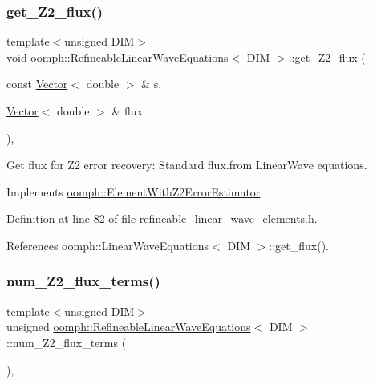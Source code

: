 \subsubsection{\texorpdfstring{get\+\_\+\+Z2\+\_\+flux()}{get\_Z2\_flux()}}
{\footnotesize\ttfamily template$<$unsigned D\+IM$>$ \\
void \hyperlink{classoomph_1_1RefineableLinearWaveEquations}{oomph\+::\+Refineable\+Linear\+Wave\+Equations}$<$ D\+IM $>$\+::get\+\_\+\+Z2\+\_\+flux (\begin{DoxyParamCaption}\item[{const \hyperlink{classoomph_1_1Vector}{Vector}$<$ double $>$ \&}]{s,  }\item[{\hyperlink{classoomph_1_1Vector}{Vector}$<$ double $>$ \&}]{flux }\end{DoxyParamCaption})\hspace{0.3cm}{\ttfamily [inline]}, {\ttfamily [virtual]}}



Get \textquotesingle{}flux\textquotesingle{} for Z2 error recovery\+: Standard flux.\+from Linear\+Wave equations. 



Implements \hyperlink{classoomph_1_1ElementWithZ2ErrorEstimator_a5688ff5f546d81771cabad82ca5a7556}{oomph\+::\+Element\+With\+Z2\+Error\+Estimator}.



Definition at line 82 of file refineable\+\_\+linear\+\_\+wave\+\_\+elements.\+h.



References oomph\+::\+Linear\+Wave\+Equations$<$ D\+I\+M $>$\+::get\+\_\+flux().

\mbox{\label{classoomph_1_1RefineableLinearWaveEquations_a83b2ad0eb1bbcfe802b48d433d104f3d}} 
\subsubsection{\texorpdfstring{num\+\_\+\+Z2\+\_\+flux\+\_\+terms()}{num\_Z2\_flux\_terms()}}
{\footnotesize\ttfamily template$<$unsigned D\+IM$>$ \\
unsigned \hyperlink{classoomph_1_1RefineableLinearWaveEquations}{oomph\+::\+Refineable\+Linear\+Wave\+Equations}$<$ D\+IM $>$\+::num\+\_\+\+Z2\+\_\+flux\+\_\+terms (\begin{DoxyParamCaption}{ }\end{DoxyParamCaption})\hspace{0.3cm}{\ttfamily [inline]}, {\ttfamily [virtual]}}



